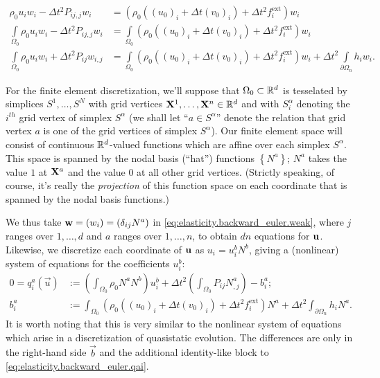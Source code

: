\begin{subequations}
\begin{align}
\rho_0 u_i w_i - \Delta t^2 P_{ij,j} w_i & = \left( \rho_0 \left( (u_0)_i + \Delta t (v_0)_i \right) + \Delta t^2 f^{\text{ext}}_i \right) w_i \\
\int\limits_{\Omega_0} \rho_0 u_i w_i - \Delta t^2 P_{ij,j} w_i & = \int\limits_{\Omega_0} \left( \rho_0 \left( (u_0)_i + \Delta t (v_0)_i \right) + \Delta t^2 f^{\text{ext}}_i \right) w_i \\
\int\limits_{\Omega_0} \rho_0 u_i w_i + \Delta t^2 P_{ij} w_{i,j} & = \int\limits_{\Omega_0} \left( \rho_0 \left( (u_0)_i + \Delta t (v_0)_i \right) + \Delta t^2 f^{\text{ext}}_i \right) w_i + \Delta t^2 \int\limits_{\partial \Omega_n} h_i w_i. \label{eq:elasticity.backward_euler.weak}
\end{align}
\end{subequations}

For the finite element discretization, we'll suppose that $\Omega_0 \subset \mathbb{R}^d$ is tesselated by simplices $S^1, \dotsc, S^N$ with grid vertices $\mathbf{X}^1, \dotsc, \mathbf{X}^n \in \mathbb{R}^d$ and with $S^{\alpha}_i$ denoting the $i^{th}$ grid vertex of simplex $S^{\alpha}$ (we shall let ``$a \in S^{\alpha}$'' denote the relation that grid vertex $a$ is one of the grid vertices of simplex $S^{\alpha}$). Our finite element space will consist of continuous $\mathbb{R}^d$-valued functions which are affine over each simplex $S^{\alpha}$. This space is spanned by the nodal basis (``hat'') functions $\left\{ N^a \right\}$; $N^a$ takes the value $1$ at $\mathbf{X}^a$ and the value $0$ at all other grid vertices. (Strictly speaking, of course, it's really the {\em projection} of this function space on each coordinate that is spanned by the nodal basis functions.)

We thus take $\mathbf{w} = (w_i) = \left( \delta_{ij} N^a \right)$ in \eqref{eq:elasticity.backward_euler.weak}, where $j$ ranges over $1, \dotsc, d$ and $a$ ranges over $1, \dotsc, n$, to obtain $d n$ equations for $\mathbf{u}$. Likewise, we discretize each coordinate of $\mathbf{u}$ as $u_i = u_i^b N^b$, giving a (nonlinear) system of equations for the coefficients $u_i^b$:
\begin{subequations}\label{eq:elasticity.backward_euler.qb}
\begin{align}
0 = q^a_i \left( \vec{u} \right) & := \left( \int_{\Omega_0} \rho_0 N^a N^b \right) u_i^b + \Delta t^2 \left( \int_{\Omega_0} P_{ij} N^a_{,j} \right) - b^a_i; \label{eq:elasticity.backward_euler.qai} \\
b^a_i & := \int_{\Omega_0} \left( \rho_0 \left( (u_0)_i + \Delta t (v_0)_i \right) + \Delta t^2 f^{\text{ext}}_i \right) N^a + \Delta t^2 \int_{\partial \Omega_n} h_i N^a.
\end{align}
\end{subequations}
It is worth noting that this is very similar to the nonlinear system of equations which arise in a discretization of quasistatic evolution. The differences are only in the right-hand side $\vec{b}$ and the additional identity-like block to \eqref{eq:elasticity.backward_euler.qai}.

